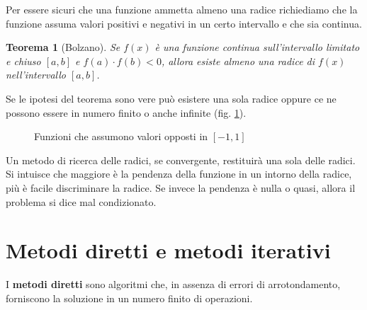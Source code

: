 \documentclass[10pt]{article}
\newtheorem{theorem}{Teorema}
\begin{document}
Per essere sicuri che una funzione ammetta almeno una radice richiediamo che la funzione assuma valori positivi e negativi in un certo intervallo e che sia continua.

\begin{theorem}[Bolzano]
Se $f (x)$ è una funzione continua sull'intervallo limitato e chiuso $[a, b]$ e $f (a) \cdot f (b) < 0$, allora esiste almeno una radice di $f (x)$ nell'intervallo $[a, b]$.
\end{theorem}

Se le ipotesi del teorema sono vere può esistere una sola radice oppure ce ne possono essere in numero finito o anche infinite (fig. \ref{fig:ipotesibolzano}).

\begin{figure}[ht]
    \centering
    \caption{Funzioni che assumono valori opposti in $[-1, 1]$}
    \label{fig:ipotesibolzano}
    \end{figure}


Un metodo di ricerca delle radici, se convergente, restituirà una sola delle radici.
Si intuisce che maggiore è la pendenza della funzione in un intorno della radice, più è facile discriminare la radice. Se invece la pendenza è nulla o quasi, allora il problema si dice mal condizionato.

\section{Metodi diretti e metodi iterativi}


I \textbf{metodi diretti} sono algoritmi che, in assenza di errori di arrotondamento, forniscono la soluzione in un numero finito di operazioni.
\end{document}
